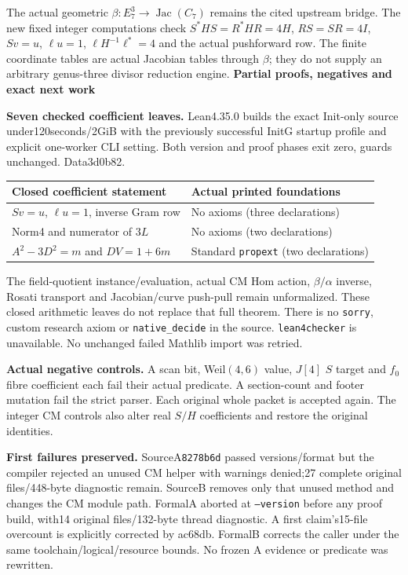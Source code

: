 \documentclass[10pt,a4paper]{article}
\begin{document}
The actual geometric $\beta:E_7^3\to\operatorname{Jac}(C_7)$ remains
the cited upstream bridge. The new fixed integer computations check
$S^*HS=R^*HR=4H$, $RS=SR=4I$, $Sv=u$, $\ell u=1$,
$\ell H^{-1}\ell^*=4$ and the actual pushforward row. The finite
coordinate tables are actual Jacobian tables through $\beta$; they do
not supply an arbitrary genus-three divisor reduction engine.
\newpage
{\Large\bfseries Partial proofs, negatives and exact next work}\par
\textbf{Seven checked coefficient leaves.} Lean4.35.0 builds the exact
Init-only source under120seconds/2GiB with the previously successful
InitG startup profile and explicit one-worker CLI setting. Both version
and proof phases exit zero, guards unchanged. Data3d0b82.

\begin{center}
\begin{tabular}{>{\raggedright\arraybackslash}p{76mm}>{\raggedright\arraybackslash}p{83mm}}
\toprule
Closed coefficient statement & Actual printed foundations\\
\midrule
$Sv=u$, $\ell u=1$, inverse Gram row & No axioms (three declarations)\\
Norm4 and numerator of $3L$ & No axioms (two declarations)\\
$A^2-3D^2=m$ and $DV=1+6m$ & Standard \texttt{propext} (two declarations)\\
\bottomrule
\end{tabular}
\end{center}

The field-quotient instance/evaluation, actual CM Hom action,
$\beta/\alpha$ inverse, Rosati transport and Jacobian/curve push-pull
remain unformalized. These closed arithmetic leaves do not replace that
full theorem. There is no \texttt{sorry}, custom research axiom or
\texttt{native\_decide} in the source. \texttt{lean4checker} is unavailable.
No unchanged failed Mathlib import was retried.

\textbf{Actual negative controls.} A scan bit, Weil$(4,6)$ value,
$J[4]$ $S$ target and $f_0$ fibre coefficient each fail their actual
predicate. A section-count and footer mutation fail the strict parser.
Each original whole packet is accepted again. The integer CM controls
also alter real $S/H$ coefficients and restore the original identities.

\textbf{First failures preserved.} SourceA\texttt{8278b6d} passed
versions/format but the compiler rejected an unused CM helper with
warnings denied;27 complete original files/448-byte diagnostic remain.
SourceB removes only that unused method and changes the CM module path.
FormalA aborted at \texttt{--version} before any proof build, with14
original files/132-byte thread diagnostic. A first claim's15-file
overcount is explicitly corrected by ac68db. FormalB corrects the caller
under the same toolchain/logical/resource bounds. No frozen A evidence
or predicate was rewritten.
\end{document}
